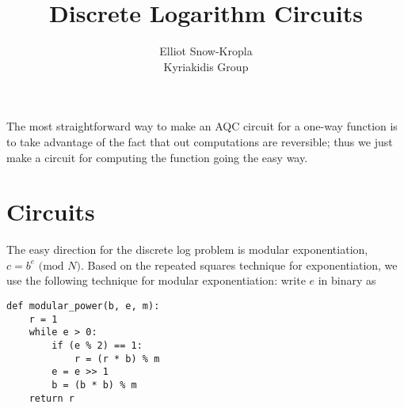 \documentclass{article}
\title{Discrete Logarithm Circuits}
\author{Elliot Snow-Kropla\\Kyriakidis Group}
\begin{document}
\maketitle
The most straightforward way to make an AQC circuit for a one-way function is to take advantage of the fact that out computations are reversible; thus we just make a circuit for computing the function going the easy way.

\section{Circuits}
The easy direction for the discrete log problem is modular exponentiation, $c = b^e \text{ (mod }N\text{)}$.  Based on the repeated squares technique for exponentiation, we use the following technique for modular exponentiation\cite{mod_exp}: write $e$ in binary as 


\begin{lstlisting}
def modular_power(b, e, m):
	r = 1
	while e > 0:
		if (e % 2) == 1:
			r = (r * b) % m
		e = e >> 1
		b = (b * b) % m
	return r
\end{lstlisting}



{}

\end{document}
